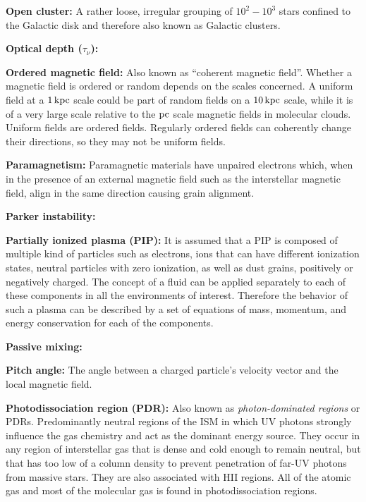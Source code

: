 \documentclass[a4paper,10pt]{article}
\begin{document}
{\noindent}\textbf{Open cluster:} A rather loose, irregular grouping of $10^2-10^3$ stars confined to the Galactic disk and therefore also known as Galactic clusters. 

{\noindent}\textbf{Optical depth ($\tau_\nu$):} 

{\noindent}\textbf{Ordered magnetic field:} Also known as ``coherent magnetic field''. Whether a magnetic field is ordered or random depends on the scales concerned. A uniform field at a $1\,{\rm kpc}$ scale could be part of random fields on a $10\,{\rm kpc}$ scale, while it is of a very large scale relative to the $\rm pc$ scale magnetic fields in molecular clouds. Uniform fields are ordered fields. Regularly ordered fields can coherently change their directions, so they may not be uniform fields. 

{\noindent}\textbf{Paramagnetism:} Paramagnetic materials have unpaired electrons which, when in the presence of an external magnetic field such as the interstellar magnetic field, align in the same direction causing grain alignment.

{\noindent}\textbf{Parker instability:}

{\noindent}\textbf{Partially ionized plasma (PIP):} It is assumed that a PIP is composed of multiple kind of particles such as electrons, ions that can have different ionization states, neutral particles with zero ionization, as well as dust grains, positively or negatively charged. The concept of a fluid can be applied separately to each of these components in all the environments of interest. Therefore the behavior of such a plasma can be described by a set of equations of mass, momentum, and energy conservation for each of the components.

{\noindent}\textbf{Passive mixing:}

{\noindent}\textbf{Pitch angle:} The angle between a charged particle's velocity vector and the local magnetic field.

{\noindent}\textbf{Photodissociation region (PDR):} Also known as \textit{photon-dominated regions} or PDRs. Predominantly neutral regions of the ISM in which UV photons strongly influence the gas chemistry and act as the dominant energy source. They occur in any region of interstellar gas that is dense and cold enough to remain neutral, but that has too low of a column density to prevent penetration of far-UV photons from massive stars. They are also associated with HII regions. All of the atomic gas and most of the molecular gas is found in photodissociation regions.
\end{document}
